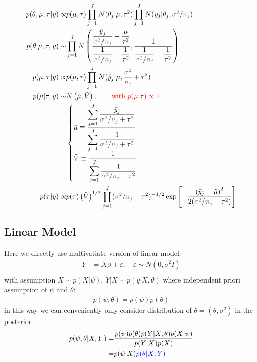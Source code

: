 \begin{align}
    p(\theta ,\mu ,\tau|y)\propto & p(\mu ,\tau)\prod_{j=1}^J N(\theta _j|\mu ,\tau^2)\prod_{j=1}^JN(\bar{y}_j|\theta _j,\fixed{\sigma ^2}/\fixed{n_j})\\
    p(\theta |\mu ,\tau,y)\sim &\prod_{j=1}^J N\left( \dfrac{ \dfrac{ \bar{y}_j }{ \fixed{\sigma ^2}/\fixed{n_j} } + \dfrac{ \mu  }{ \tau^2 }  }{ \dfrac{ 1 }{ \fixed{\sigma ^2}/\fixed{n_j} } + \dfrac{ 1  }{ \tau^2 } } , \dfrac{ 1 }{ \dfrac{ 1 }{ \fixed{\sigma ^2}/\fixed{n_j} } + \dfrac{ 1  }{ \tau^2 } }  \right)\\
    p(\mu ,\tau |y)\propto & p(\mu ,\tau)\prod_{j=1}^J N(\bar{y}_j| \mu , \dfrac{ \fixed{\sigma ^2} }{ \fixed{n_j} }+\tau^2 )\\
    p(\mu |\tau, y)\sim & N\left( \tilde{\mu },\tilde{V} \right),\qquad \text{\color{red}with }\color{red}p(\mu |\tau)\propto 1\\
    & \begin{cases}
        \tilde{\mu }\equiv {\dfrac{ \displaystyle \sum_{j=1}^J \dfrac{ \bar{y}_j }{ \fixed{\sigma ^2}/\fixed{n_j}+\tau^2 }  }{ \displaystyle \sum_{j=1}^J \dfrac{ 1 }{ \fixed{\sigma ^2}/\fixed{n_j}+\tau^2 } }}\\
        \tilde{V}\equiv {\dfrac{ 1 }{ \displaystyle \sum_{j=1}^J \dfrac{ 1 }{ \fixed{\sigma ^2}/\fixed{n_j}+\tau^2 } }}
    \end{cases}\\
    p(\tau|y)\propto & p(\tau)\left(\tilde{V}\right)^{1/2}\prod_{j=1}^J(\fixed{\sigma ^2}/\fixed{n_j}+\tau^2 )^{-1/2}\exp\left[ -\dfrac{ \left(\bar{y}_j -\tilde{\mu } \right)^2 }{ 2(\fixed{\sigma ^2}/\fixed{n_j}+\tau^2 ) }  \right]
\end{align}



\subsection{Linear Model}\label{SubSubSectionBayesianLinearModel}

Here we directly use multivatiate version of linear model:
\begin{align}
    Y&=X\beta +\varepsilon  ,\quad \varepsilon \sim N(0,\sigma ^2I )\\
\end{align}
with assumption $ X\sim p(X|\psi) $, $ Y|X\sim p(y|X,\theta ) $ where independent priori assumption of $ \psi  $ and $ \theta  $:
\begin{align}
    p(\psi, \theta )=p(\psi)p(\theta ) 
\end{align}
in this way we can conveniently only consider distribution of $ \theta =(\theta ,\sigma ^2) $ in the posterior
\begin{align}
    p(\psi, \theta |X,Y)=&\dfrac{ p(\psi)p(\theta )p(Y|X,\theta )p(X|\psi) }{ p(Y|X) p(X)}\\
    =& p(\psi |X)\color{blue}p(\theta |X,Y)
\end{align}


